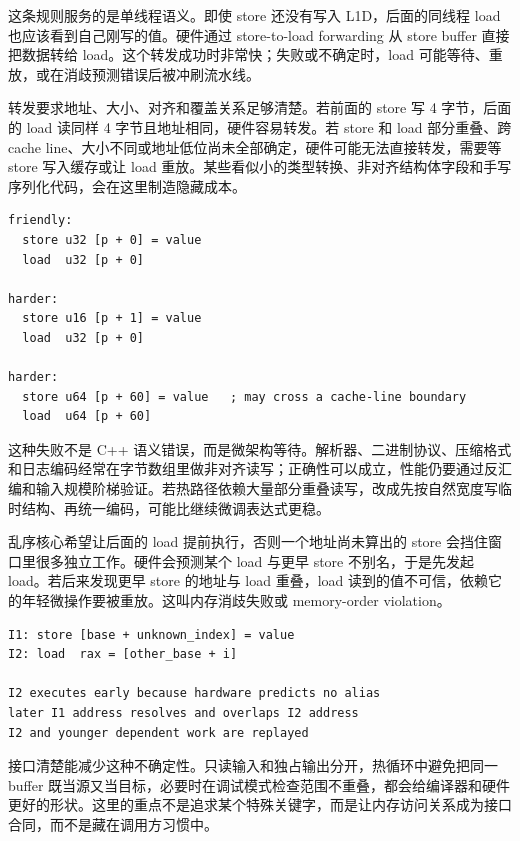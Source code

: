 这条规则服务的是单线程语义。即使 store 还没有写入 L1D，后面的同线程 load 也应该看到自己刚写的值。硬件通过 store-to-load forwarding 从 store buffer 直接把数据转给 load。这个转发成功时非常快；失败或不确定时，load 可能等待、重放，或在消歧预测错误后被冲刷流水线。

转发要求地址、大小、对齐和覆盖关系足够清楚。若前面的 store 写 4 字节，后面的 load 读同样 4 字节且地址相同，硬件容易转发。若 store 和 load 部分重叠、跨 cache line、大小不同或地址低位尚未全部确定，硬件可能无法直接转发，需要等 store 写入缓存或让 load 重放。某些看似小的类型转换、非对齐结构体字段和手写序列化代码，会在这里制造隐藏成本。

\begin{lstlisting}[numbers=none,caption={转发友好和不友好的形状}]
friendly:
  store u32 [p + 0] = value
  load  u32 [p + 0]

harder:
  store u16 [p + 1] = value
  load  u32 [p + 0]

harder:
  store u64 [p + 60] = value   ; may cross a cache-line boundary
  load  u64 [p + 60]
\end{lstlisting}

这种失败不是 C++ 语义错误，而是微架构等待。解析器、二进制协议、压缩格式和日志编码经常在字节数组里做非对齐读写；正确性可以成立，性能仍要通过反汇编和输入规模阶梯验证。若热路径依赖大量部分重叠读写，改成先按自然宽度写临时结构、再统一编码，可能比继续微调表达式更稳。

乱序核心希望让后面的 load 提前执行，否则一个地址尚未算出的 store 会挡住窗口里很多独立工作。硬件会预测某个 load 与更早 store 不别名，于是先发起 load。若后来发现更早 store 的地址与 load 重叠，load 读到的值不可信，依赖它的年轻微操作要被重放。这叫内存消歧失败或 memory-order violation。

\begin{lstlisting}[numbers=none,caption={一次内存消歧失败的事件链}]
I1: store [base + unknown_index] = value
I2: load  rax = [other_base + i]

I2 executes early because hardware predicts no alias
later I1 address resolves and overlaps I2 address
I2 and younger dependent work are replayed
\end{lstlisting}

接口清楚能减少这种不确定性。只读输入和独占输出分开，热循环中避免把同一 buffer 既当源又当目标，必要时在调试模式检查范围不重叠，都会给编译器和硬件更好的形状。这里的重点不是追求某个特殊关键字，而是让内存访问关系成为接口合同，而不是藏在调用方习惯中。

